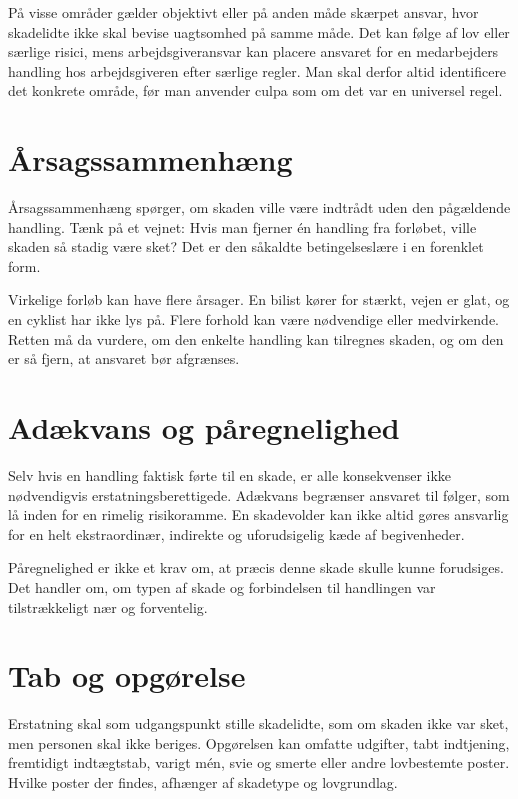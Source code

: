 På visse områder gælder objektivt eller på anden måde skærpet ansvar, hvor skadelidte ikke skal bevise uagtsomhed på samme måde. Det kan følge af lov eller særlige risici, mens arbejdsgiveransvar kan placere ansvaret for en medarbejders handling hos arbejdsgiveren efter særlige regler. Man skal derfor altid identificere det konkrete område, før man anvender culpa som om det var en universel regel.

\section{Årsagssammenhæng}

Årsagssammenhæng spørger, om skaden ville være indtrådt uden den pågældende handling. Tænk på et vejnet: Hvis man fjerner én handling fra forløbet, ville skaden så stadig være sket? Det er den såkaldte betingelseslære i en forenklet form.

Virkelige forløb kan have flere årsager. En bilist kører for stærkt, vejen er glat, og en cyklist har ikke lys på. Flere forhold kan være nødvendige eller medvirkende. Retten må da vurdere, om den enkelte handling kan tilregnes skaden, og om den er så fjern, at ansvaret bør afgrænses.

\section{Adækvans og påregnelighed}

Selv hvis en handling faktisk førte til en skade, er alle konsekvenser ikke nødvendigvis erstatningsberettigede. Adækvans begrænser ansvaret til følger, som lå inden for en rimelig risikoramme. En skadevolder kan ikke altid gøres ansvarlig for en helt ekstraordinær, indirekte og uforudsigelig kæde af begivenheder.

Påregnelighed er ikke et krav om, at præcis denne skade skulle kunne forudsiges. Det handler om, om typen af skade og forbindelsen til handlingen var tilstrækkeligt nær og forventelig.

\section{Tab og opgørelse}

Erstatning skal som udgangspunkt stille skadelidte, som om skaden ikke var sket, men personen skal ikke beriges. Opgørelsen kan omfatte udgifter, tabt indtjening, fremtidigt indtægtstab, varigt mén, svie og smerte eller andre lovbestemte poster. Hvilke poster der findes, afhænger af skadetype og lovgrundlag.

